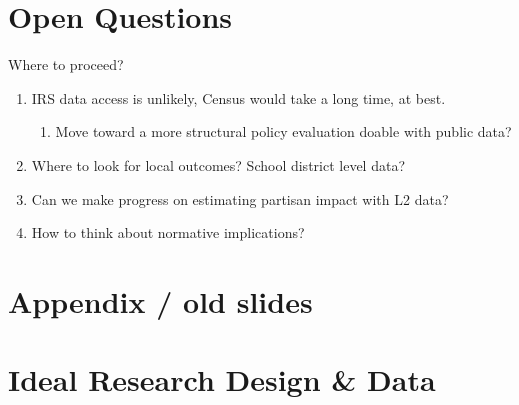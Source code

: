 \documentclass[10pt, aspectratio=169]{beamer}
\begin{document}
\section{Open Questions}

\begin{frame}{Where to proceed?}
    \begin{enumerate}
        \item IRS data access is unlikely, Census would take a long time, at best. 
        \begin{enumerate}
            \item[$\rightarrow$]Move toward a more structural policy evaluation doable with public data?
        \end{enumerate}
        \item Where to look for local outcomes? School district level data?
        \item Can we make progress on estimating partisan impact with L2 data?
        \item How to think about normative implications?
    \end{enumerate}
\end{frame}

\section[Appendix / old slides]{Appendix / old slides}




\section{Ideal Research Design \& Data}
\end{document}
